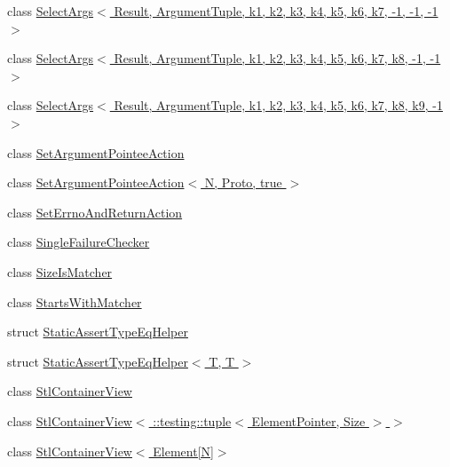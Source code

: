 \begin{DoxyCompactItemize}
\item 
class \hyperlink{classtesting_1_1internal_1_1SelectArgs_3_01Result_00_01ArgumentTuple_00_01k1_00_01k2_00_01k3_00_39929402cb68b57f60e280a41eb60fed}{Select\+Args$<$ Result, Argument\+Tuple, k1, k2, k3, k4, k5, k6, k7, -\/1, -\/1, -\/1 $>$}
\item 
class \hyperlink{classtesting_1_1internal_1_1SelectArgs_3_01Result_00_01ArgumentTuple_00_01k1_00_01k2_00_01k3_00_5bf9522b4f7bab9048d7587f1d9fbf27}{Select\+Args$<$ Result, Argument\+Tuple, k1, k2, k3, k4, k5, k6, k7, k8, -\/1, -\/1 $>$}
\item 
class \hyperlink{classtesting_1_1internal_1_1SelectArgs_3_01Result_00_01ArgumentTuple_00_01k1_00_01k2_00_01k3_00_a44b2a3fb6bab261818c61ba2b7f389a}{Select\+Args$<$ Result, Argument\+Tuple, k1, k2, k3, k4, k5, k6, k7, k8, k9, -\/1 $>$}
\item 
class \hyperlink{classtesting_1_1internal_1_1SetArgumentPointeeAction}{Set\+Argument\+Pointee\+Action}
\item 
class \hyperlink{classtesting_1_1internal_1_1SetArgumentPointeeAction_3_01N_00_01Proto_00_01true_01_4}{Set\+Argument\+Pointee\+Action$<$ N, Proto, true $>$}
\item 
class \hyperlink{classtesting_1_1internal_1_1SetErrnoAndReturnAction}{Set\+Errno\+And\+Return\+Action}
\item 
class \hyperlink{classtesting_1_1internal_1_1SingleFailureChecker}{Single\+Failure\+Checker}
\item 
class \hyperlink{classtesting_1_1internal_1_1SizeIsMatcher}{Size\+Is\+Matcher}
\item 
class \hyperlink{classtesting_1_1internal_1_1StartsWithMatcher}{Starts\+With\+Matcher}
\item 
struct \hyperlink{structtesting_1_1internal_1_1StaticAssertTypeEqHelper}{Static\+Assert\+Type\+Eq\+Helper}
\item 
struct \hyperlink{structtesting_1_1internal_1_1StaticAssertTypeEqHelper_3_01T_00_01T_01_4}{Static\+Assert\+Type\+Eq\+Helper$<$ T, T $>$}
\item 
class \hyperlink{classtesting_1_1internal_1_1StlContainerView}{Stl\+Container\+View}
\item 
class \hyperlink{classtesting_1_1internal_1_1StlContainerView_3_01_1_1testing_1_1tuple_3_01ElementPointer_00_01Size_01_4_01_4}{Stl\+Container\+View$<$ \+::testing\+::tuple$<$ Element\+Pointer, Size $>$ $>$}
\item 
class \hyperlink{classtesting_1_1internal_1_1StlContainerView_3_01Element[N]_4}{Stl\+Container\+View$<$ Element\mbox{[}\+N\mbox{]}$>$}

\end{DoxyCompactItemize}
